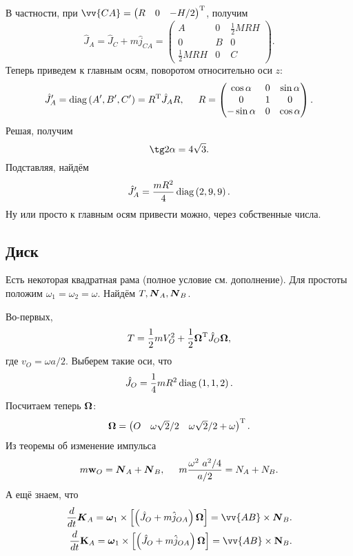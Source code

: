 В частности, при $\vv{CA} = \begin{pmatrix}
    R & 0 & -H/2
\end{pmatrix}\T$, получим
$$
    \hat J_A = \hat J_C + m \hat j_{CA} =
    \begin{pmatrix}
        A & 0 & \frac{1}{2} MRH \\
        0 & B & 0 \\
        \frac{1}{2} MRH & 0 & C
    \end{pmatrix}.
$$
Теперь приведем к главным осям, поворотом относительно оси $z$:
\begin{equation*}
    \hat J_A' = \mathop{\mathrm{diag}}\nolimits\left(A', B', C'\right) =
    R^{\text{T}} \hat J_A R,
    \hspace{0.5cm} 
    R = \begin{pmatrix}
        \cos \alpha & 0 & \sin \alpha \\
        0 & 1 & 0 \\
        -\sin\alpha & 0 & \cos \alpha \\
    \end{pmatrix}.
\end{equation*}
Решая, получим
$$
    \tg 2 \alpha = 4 \sqrt{3}.
$$
Подставляя, найдём
$$
    \hat J_A' = \frac{mR^2}{4}  \mathop{\mathrm{diag}}\nolimits\left(2, 9, 9\right).
$$
Ну или просто к главным осям привести можно, через собственные числа.

\subsection{Диск}

Есть некоторая квадратная рама (полное условие см. дополнение). Для простоты положим $\omega_1 = \omega_2 = \omega$.
 Найдём $T, \mbox{\boldmath $N$}_A, \mbox{\boldmath $N$}_B$. 

 Во-первых,
 $$
     T = \frac{1}{2} m V_O^2 + \frac{1}{2} \mbox{\boldmath $\Omega$}^{\text{T}} \hat{J}_O \mbox{\boldmath $\Omega$},
 $$
где $v_O = \omega a / 2$.
Выберем такие оси, что
$$
    \hat J_O = \frac{1}{4} mR^2 \mathop{\mathrm{diag}}\nolimits\left(1,1,2\right) .
$$
Посчитаем теперь $\mbox{\boldmath $\Omega$}$:
$$
    \mbox{\boldmath $\Omega$} = \begin{pmatrix}
        O & \omega \sqrt{2}/2 & \omega \sqrt{2}/2 + \omega
    \end{pmatrix}^{\text{T}}.
$$
Из теоремы об изменение импульса
$$
    m \mbox{\boldmath $\mathrm{w}$}_O = \mbox{\boldmath $N$}_A + \mbox{\boldmath $N$}_B,
    \hspace{0.5cm} 
    m \frac{\omega^2 \ a^2/4}{a/2}  = N_A + N_B.
$$
А ещё знаем, что
\begin{align*}
    \frac{d}{dt} \vc{K}_A =
    \vc{\omega}_1 \times \left[
    \left(
        \hat J_O + m \hat{j}_{OA}
    \right) \vc{\Omega}
    \right]
    = \vv{AB} \times \vc{N}_B. \\
    \frac{d}{dt} \vc{\mathrm K}_A =
    \vc{\omega}_1 \times \left[
    \left(
        \hat J_O + m \hat{j}_{OA}
    \right) \vc{\Omega}
    \right]
    = \vv{AB} \times \vc{\mathrm N}_B. 
\end{align*}
